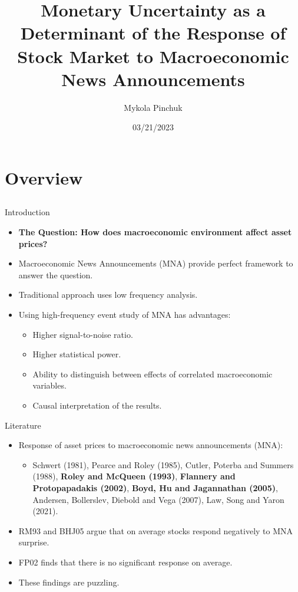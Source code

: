 \documentclass{beamer}
\title[Monetary Uncertainty as a Determinant of the Response of Stock Market to MNAs]{Monetary Uncertainty as a Determinant of the Response of Stock Market to Macroeconomic News Announcements\\ }
\author{Mykola Pinchuk}
\date{03/21/2023}
\begin{document}
\begin{frame}
  \titlepage
\end{frame}

\section{Overview}
\subsection{}


\begin{frame}{Introduction}
\begin{itemize}
    \item {\textbf{The Question: How does macroeconomic environment affect asset prices?}}
    \item {Macroeconomic News Announcements (MNA) provide perfect framework to answer the question.}    
    \item {Traditional approach uses low frequency analysis.}    
    \item {Using high-frequency event study of MNA has advantages:}
    \begin{itemize}
        \item {Higher signal-to-noise ratio.}
        \item {Higher statistical power.}
        \item {Ability to distinguish between effects of correlated macroeconomic variables.}
        \item {Causal interpretation of the results.}
    \end{itemize}
\end{itemize}
\end{frame}


\begin{frame}{Literature}
\begin{itemize}
    \item {Response of asset prices to macroeconomic news announcements (MNA):}
    \begin{itemize}
        \item {Schwert (1981), Pearce and Roley (1985), Cutler, Poterba and Summers (1988), \textbf{Roley and McQueen (1993)}, \textbf{Flannery and Protopapadakis (2002)}, \textbf{Boyd, Hu and Jagannathan (2005)}, Andersen, Bollerslev, Diebold and Vega (2007), Law, Song and Yaron (2021).}
    \end{itemize}
    \item {RM93 and BHJ05 argue that on average stocks respond negatively to MNA surprise.}
    \item {FP02 finds that there is no significant response on average.}
    \item {These findings are puzzling.}
\end{itemize}
\end{frame}
\end{document}
